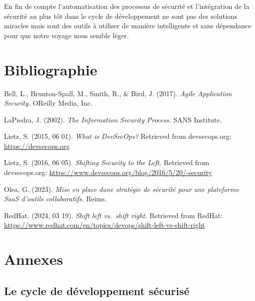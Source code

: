 \documentclass[
  11pt,
  a4paper,
  krantz2,
  11pt,
  oneside]{krantz}
\begin{document}
En fin de compte l'automatisation des processus de sécurité et l'intégration de la sécurité au plus tôt dans le cycle de développement ne sont pas des solutions miracles mais sont des outils à utiliser de manière intelligente et sans dépendance pour que notre voyage nous semble léger.

\chapter{Bibliographie}\label{bibliographie}

Bell, L., Brunton-Spall, M., Smith, R., \& Bird, J. (2017). \emph{Agile Application Security.} O\textquotesingle Reilly Media, Inc.

LaPiedra, J. (2002). \emph{The Information Security Process.} SANS Institute.

Lietz, S. (2015, 06 01). \emph{What is DevSecOps?} Retrieved from devsecops.org: \url{https://devsecops.org}

Lietz, S. (2016, 06 05). \emph{Shifting Security to the Left.} Retrieved from devsecops.org: \url{https://www.devsecops.org/blog/2016/5/20/-security}

Olea, G. (2023). \emph{Mise en place d\textquotesingle une stratégie de sécurité pour une plateforme SaaS d'outils collaboratifs.} Reims.

RedHat. (2024, 03 19). \emph{Shift left vs.~shift right.} Retrieved from RedHat: \url{https://www.redhat.com/en/topics/devops/shift-left-vs-shift-right}

\chapter{Annexes}\label{annexes}

\section{Le cycle de développement sécurisé}\label{le-cycle-de-duxe9veloppement-suxe9curisuxe9-1}
\end{document}
